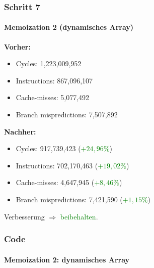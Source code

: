 \documentclass{beamer}
\newcommand{\success}[1]{\textcolor{green}{#1}}
\begin{document}
  \begin{frame}
  	\frametitle{Schritt 7}
  	\framesubtitle{Memoization 2 (dynamisches Array)}
  	\textbf{Vorher:}
		\begin{itemize}
			\item Cycles: 1,223,009,952\\
			\item Instructions: 867,096,107\\
			\item Cache-misses: 5,077,492\\
			\item Branch mispredictions: 7,507,892\\
		\end{itemize}	
				
		\textbf{Nachher:}
		\begin{itemize}
			\item Cycles: 917,739,423 (\success{$+ 24,96\%$})\\
			\item Instructions: 702,170,463 (\success{$+ 19,02\%$})\\
			\item Cache-misses: 4,647,945 (\success{$+ 8,46\%$})\\
			\item Branch mispredictions: 7,421,590 (\success{$+ 1,15\%$})\\
		\end{itemize}	
		Verbesserung $\Rightarrow$ \success{beibehalten}.
  \end{frame} 
  
  \begin{frame}
  	\frametitle{Code}
  	\framesubtitle{Memoization 2: dynamisches Array}
  	\sMemoTwo
  \end{frame}    
  
\end{document}
